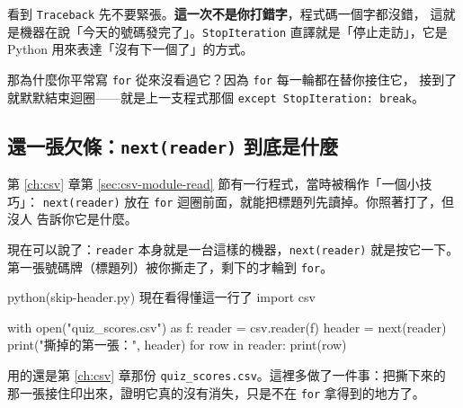 看到 \texttt{Traceback} 先不要緊張。\textbf{這一次不是你打錯字}，程式碼一個字都沒錯，
這就是機器在說「今天的號碼發完了」。\texttt{StopIteration} 直譯就是「停止走訪」，它是
Python 用來表達「沒有下一個了」的方式。

那為什麼你平常寫 \texttt{for} 從來沒看過它？因為 \texttt{for} 每一輪都在替你接住它，
接到了就默默結束迴圈——就是上一支程式那個 \texttt{except StopIteration: break}。


\subsection*{還一張欠條：\texttt{next(reader)} 到底是什麼}

第 \ref{ch:csv} 章第 \ref{sec:csv-module-read} 節有一行程式，當時被稱作「一個小技巧」：
\texttt{next(reader)} 放在 \texttt{for} 迴圈前面，就能把標題列先讀掉。你照著打了，但沒人
告訴你它是什麼。

現在可以說了：\texttt{reader} 本身就是一台這樣的機器，\texttt{next(reader)} 就是按它一下。
第一張號碼牌（標題列）被你撕走了，剩下的才輪到 \texttt{for}。

\begin{example}{python}{(skip-header.py) 現在看得懂這一行了}
import csv

with open("quiz_scores.csv") as f:
    reader = csv.reader(f)
    header = next(reader)
    print("撕掉的第一張：", header)
    for row in reader:
        print(row)
\end{example}


用的還是第 \ref{ch:csv} 章那份 \texttt{quiz\_scores.csv}。這裡多做了一件事：把撕下來的
那一張接住印出來，證明它真的沒有消失，只是不在 \texttt{for} 拿得到的地方了。

